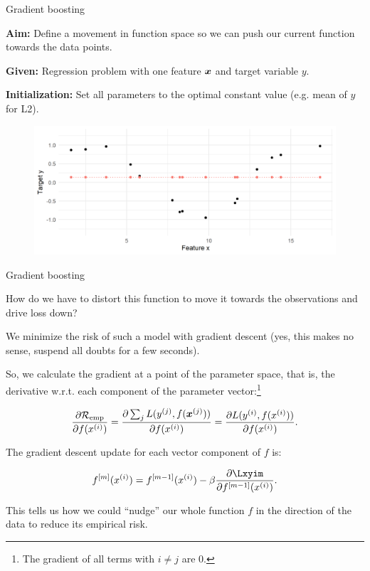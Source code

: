 \begin{vbframe}{Gradient boosting}

\textbf{Aim:} Define a movement in function space so we can push our current function towards the data points.

\vspace*{0.1cm}
\textbf{Given:} Regression problem with one feature $\bm{x}$ and target variable $y$.

\vspace*{0.1cm}
\textbf{Initialization:} Set all parameters to the optimal constant value (e.g. mean of $y$ for L2).

\begin{figure}
  \includegraphics[width=\textwidth]{figure/fig-gb-concept-1.png}
\end{figure}



\end{vbframe}

\begin{vbframe}{Gradient boosting}
\begin{footnotesize}
How do we have to distort this function to move it towards the observations and drive loss down?

\vspace*{0.2cm}
We minimize the risk of such a model with gradient descent (yes, this makes no sense,
suspend all doubts for a few seconds).

So, we calculate the gradient at a point of the parameter space, that is, the derivative w.r.t. each component of the parameter vector:\footnote{The gradient of all terms with $i \neq j$ are 0.}

$$
  \frac{\partial \mathcal{R}_{\text{emp}}}{\partial f(x^{(i)})} = \frac{\partial \sum_j L(y^{(j)}, f(\bm{x}^{(j)}))}{\partial f(x^{(i)})} = \frac{\partial L(y^{(i)}, f(x^{(i)}))}{\partial f(x^{(i)})}.
$$

\vspace*{0.2cm}

The gradient descent update for each vector component of $f$ is:

$$
  \fm (\xi) =  \fmd (\xi) - \beta \fp{\Lxyim}{\fmd (\xi)}.
$$

This tells us how we could \enquote{nudge} our whole function $f$ in the direction of the data to
reduce its empirical risk.
\end{footnotesize}



\end{vbframe}

